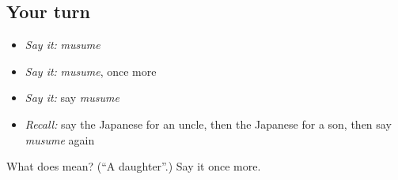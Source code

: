 \subsection*{Your turn}
\begin{itemize}
\raggedright
  \item \emph{Say it:} \emph{musume}
  \item \emph{Say it:} \emph{musume}, once more
  \item \emph{Say it:} say \emph{musume}
  \item \emph{Recall:} say the Japanese for an uncle, then the Japanese for a son, then say \emph{musume} again
\end{itemize}

\begin{tcolorbox}[breakable,colback=teal!4,colframe=teal!35!black,title={Before you move on}]
What does  mean? (\textquotedblleft{}A daughter\textquotedblright{}.) Say it once more.
\end{tcolorbox}
